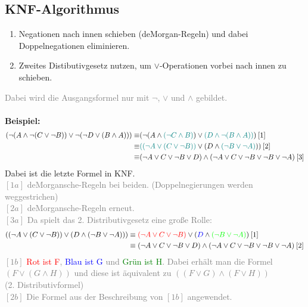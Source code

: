 \documentclass{article}
\begin{document}
\begin{itemize}
		\subsection{KNF-Algorithmus}
		\begin{enumerate}
			\item Negationen nach innen schieben (deMorgan-Regeln) und dabei Doppelnegationen eliminieren.
			\item Zweites Distibutivgesetz nutzen, um $\vee$-Operationen vorbei nach innen zu schieben.
		\end{enumerate}
		\textcolor{gray}{Dabei wird die Ausgangsformel nur mit $\neg$, $\vee$ und $\wedge$ gebildet.} \\
		\\
		\textbf{Beispiel:} \\
		\begin{align*}
			(\neg(A \wedge\neg(C \vee \neg B))\vee \neg(\neg D \vee (B \wedge A))) 
			\equiv& (\neg(A \wedge\textcolor{teal}{(\neg C \wedge B)}) \vee \textcolor{teal}{(D \wedge \neg (B \wedge A))}) \: [1] \\
			\equiv& \textcolor{teal}{((\neg A \vee (C \vee \neg B))} \vee (D \wedge \textcolor{teal}{(\neg B \vee \neg A)})) \: [2] \\
			\equiv& (\neg A \vee C \vee \neg B \vee D) \wedge (\neg A \vee C \vee \neg B \vee \neg B \vee \neg A) \: [3]
		\end{align*}
		Dabei ist die letzte Formel in KNF. \\
		\textcolor{gray}{
			$[1a]$ deMorgansche-Regeln bei beiden. (Doppelnegierungen werden weggestrichen)\\
			$[2a]$ deMorgansche-Regeln erneut.\\
			$[3a]$ Da spielt das 2. Distributivgesetz eine große Rolle:
		}
		\begin{align*}
			((\neg A \vee (C \vee \neg B)) \vee (D \wedge (\neg B \vee \neg A))) &\equiv \textcolor{red}{(\neg A \vee C \vee \neg B)} \vee (\textcolor{blue}{D} \wedge \textcolor{green}{(\neg B \vee \neg A)}) \: [1] \\
			&\equiv (\neg A \vee C \vee \neg B \vee D) \wedge (\neg A \vee C \vee \neg B \vee \neg B \vee \neg A) \: [2]
		\end{align*}
		\textcolor{gray}{
			$[1b]$ \textcolor{red}{Rot ist F}, \textcolor{blue}{Blau ist G} und \textcolor{green}{Grün ist H}. Dabei erhält man die Formel $(F \vee (G \wedge H))$ und diese ist äquivalent zu $((F \vee G) \wedge (F \vee H))$\\ (2. Distributivformel)\\
			$[2b]$ Die Formel aus der Beschreibung von $[1b]$ angewendet.\\
		}

\end{itemize}
\end{document}
